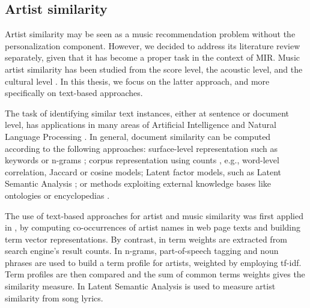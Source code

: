 \subsection{Artist similarity}
\label{sec:SOA:mir:similarity}

Artist similarity may be seen as a music recommendation problem without the personalization component. However, we decided to address its literature review separately, given that it has become a proper task in the context of MIR.
Music artist similarity has been studied from the score level, the acoustic level, and the cultural level \citep{Ellis2002}. In this thesis, we focus on the latter approach, and more specifically on text-based approaches. %

The task of identifying similar text instances, either at sentence or document level, has applications in many areas of Artificial Intelligence and Natural Language Processing \citep{LiuandWang2014}. In general, document similarity can be computed according to the following approaches: surface-level representation such as keywords or n-grams \citep{ChimandDeng2008}; corpus representation using counts \citep{Rorvig1999}, e.g., word-level correlation, Jaccard or cosine models; Latent factor models, such as Latent Semantic Analysis \citep{Deerwesteretal1990}; or methods exploiting external knowledge bases like ontologies or encyclopedias \citep{Huetal2009}.

The use of text-based approaches for artist and music similarity was first applied in \citep{Cohen2000}, by computing co-occurrences of artist names in web page texts and building term vector representations. By contrast, in \citep{Schedl2005} term weights are extracted from search engine's result counts. In \cite{Whitman2002} n-grams, part-of-speech tagging and noun phrases are used to build a term profile for artists, weighted by employing tf-idf. Term profiles are then compared and the sum of common terms weights gives the similarity measure. %
In \cite{Logan2003} Latent Semantic Analysis is used to measure artist similarity from song lyrics. %

